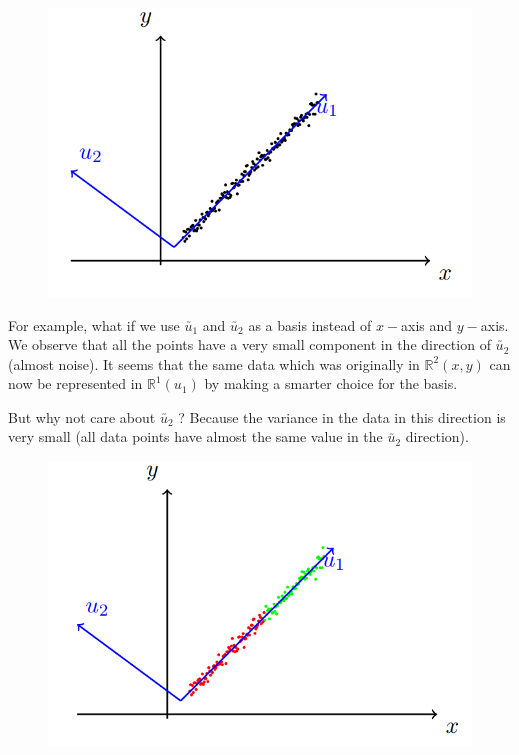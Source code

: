 \documentclass[11pt, a4paper]{article}
\begin{document}
\begin{figure}[!htbp]

\centering

\includegraphics[scale=0.5]{image_8.png}

\end{figure}

For example, what if we use $\utilde{u_1}$ and $\utilde{u_2}$ as a basis instead of $x-$axis and $y-$axis. We observe that all the points have a
very small component in the direction of $\utilde{u_2}$ (almost noise). It seems that the same data which was originally in $\mathbb{R}^2 (x, y)$ can now be represented in $\mathbb{R}^1(u_1)$ by making a smarter choice for the basis. \\

\hspace{0.3cm}

But why not care about $\utilde{u_2}$ ? Because the variance in the data in this direction is very small (all data points have almost the same value in the $\utilde{u_2}$ direction).

\begin{figure}[!htbp]

\centering

\includegraphics[scale=0.5]{image_9.png}

\end{figure}
\end{document}
